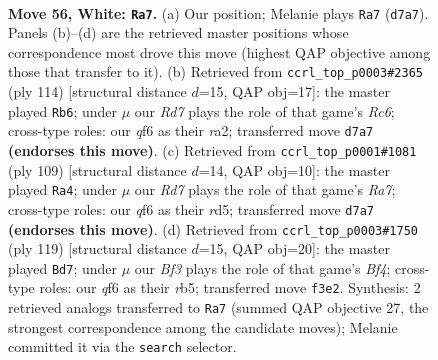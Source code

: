 \documentclass[11pt]{article}
\begin{document}
\clearpage

\begin{figure}[p]\centering
\begin{subfigure}{0.46\textwidth}\centering
\resizebox{\linewidth}{!}{%
\newchessgame
\chessboard[
  setfen={8/3R4/5q2/2k5/1p6/b4BK1/8/8 w - - 2 56},
  showmover=false,
  pgfstyle=straightmove, color=movearrow, markmove={d7-a7}
]}
\caption{}
\end{subfigure}\hfill
\begin{subfigure}{0.46\textwidth}\centering
\resizebox{\linewidth}{!}{%
\newchessgame
\chessboard[
  setfen={8/6k1/2R4p/6b1/8/8/r3B3/5K2 w - - 6 58},
  showmover=false,
  pgfstyle=straightmove, color=movearrow, markmove={c6-b6}
]}
\caption{}
\end{subfigure}
\\[4pt]
\begin{subfigure}{0.46\textwidth}\centering
\resizebox{\linewidth}{!}{%
\newchessgame
\chessboard[
  setfen={8/8/5k2/3Rb3/6B1/4K2P/r7/8 b - - 20 55},
  showmover=false,
  pgfstyle=straightmove, color=movearrow, markmove={a2-a4}
]}
\caption{}
\end{subfigure}\hfill
\begin{subfigure}{0.46\textwidth}\centering
\resizebox{\linewidth}{!}{%
\newchessgame
\chessboard[
  setfen={8/8/5k2/1R3b2/7r/1B6/P2K4/8 b - - 6 60},
  showmover=false,
  pgfstyle=straightmove, color=movearrow, markmove={f5-d7}
]}
\caption{}
\end{subfigure}
\caption{\textbf{Move 56, White: \texttt{Ra7}.} (a) Our position; Melanie plays \texttt{Ra7} (\texttt{d7a7}). Panels (b)--(d) are the retrieved master positions whose correspondence most drove this move (highest QAP objective among those that transfer to it). (b) Retrieved from \texttt{ccrl\_top\_p0003\#2365} (ply 114) [structural distance $d$=15, QAP obj=17]: the master played \texttt{Rb6}; under $\mu$ our \emph{Rd7} plays the role of that game's \emph{Rc6}; cross-type roles: our \emph{q}f6 as their \emph{r}a2; transferred move \texttt{d7a7} \textbf{(endorses this move)}. (c) Retrieved from \texttt{ccrl\_top\_p0001\#1081} (ply 109) [structural distance $d$=14, QAP obj=10]: the master played \texttt{Ra4}; under $\mu$ our \emph{Rd7} plays the role of that game's \emph{Ra7}; cross-type roles: our \emph{q}f6 as their \emph{r}d5; transferred move \texttt{d7a7} \textbf{(endorses this move)}. (d) Retrieved from \texttt{ccrl\_top\_p0003\#1750} (ply 119) [structural distance $d$=15, QAP obj=20]: the master played \texttt{Bd7}; under $\mu$ our \emph{Bf3} plays the role of that game's \emph{Bf4}; cross-type roles: our \emph{q}f6 as their \emph{r}b5; transferred move \texttt{f3e2}. Synthesis: 2 retrieved analogs transferred to \texttt{Ra7} (summed QAP objective 27, the strongest correspondence among the candidate moves); Melanie committed it via the \texttt{search} selector.}
\label{fig:thought-m110}
\end{figure}
\end{document}

